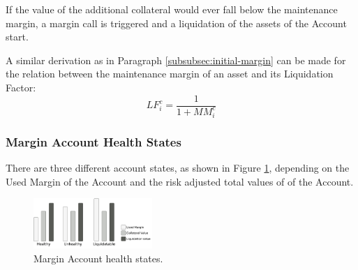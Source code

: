 \documentclass[sigconf,nonacm]{acmart}
\begin{document}
If the value of the additional collateral would ever fall below the maintenance margin, a margin call is triggered and a liquidation of the assets of the Account start.

A similar derivation as in Paragraph \ref{subsubsec:initial-margin} can be made for the relation between the maintenance margin of an asset and its Liquidation Factor:
\begin{equation}
    LF_{i}^{c} = \frac{1}{1 + MM_{i}^{c}}
\end{equation}

\subsubsection{Margin Account Health States}
\label{subsubsec:margin-account-health-states}
There are three different account states, as shown in Figure \ref{fig:health-states},
depending on the Used Margin of the Account and the risk adjusted total values of of the Account.

\begin{figure}
    \centering
    \includegraphics[width=0.4\textwidth]{images/Health-States.png}
    \caption{Margin Account health states. \label{fig:health-states}}
\end{figure}
\end{document}
